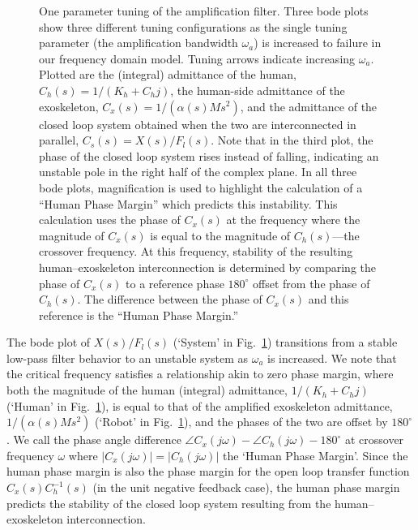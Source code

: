 \documentclass[utf8]{frontiersSCNS}
\newcommand{\add}[1]{\textcolor[HTML]{8710b3}{#1}}
\begin{document}
\begin{figure}
	\centering
	\resizebox{1\textwidth}{!}{
	\def\svgwidth{\textwidth}
	{%
		}}
	\caption{One parameter tuning of the amplification filter. Three bode plots show three different tuning configurations as the single tuning parameter (the amplification bandwidth $\omega_a$) is increased to failure in our frequency domain model. Tuning arrows indicate increasing $\omega_a$. Plotted are the (integral) admittance of the human, $C_h(s)=1/(K_h+C_h j)$, the human-side admittance of the exoskeleton, $C_x(s)=1/(\alpha(s)Ms^2)$, and the admittance of the closed loop system obtained when the two are interconnected in parallel, $C_s(s) = X(s)/F_l(s)$. Note that in the third plot, the phase of the closed loop system rises instead of falling, indicating an unstable pole in the right half of the complex plane. In all three bode plots, magnification is used to highlight the calculation of a ``Human Phase Margin'' which predicts this instability. This calculation uses the phase of $C_x(s)$ at the frequency where the magnitude of $C_x(s)$ is equal to the magnitude of $C_h(s)$---the crossover frequency. At this frequency, stability of the resulting human--exoskeleton interconnection is determined by comparing the phase of $C_x(s)$ to a reference phase $180^\circ$ offset from the phase of $C_h(s)$. The difference between the phase of $C_x(s)$ and this reference is the ``Human Phase Margin.'' }\label{fig:oneptune}
\end{figure}

The bode plot of $X(s)/F_l(s)$ (`System' in Fig.~\ref{fig:oneptune}) transitions from a stable low-pass filter behavior to an unstable system as $\omega_a$ is increased. We note that the critical frequency satisfies a relationship akin to zero phase margin, where both the magnitude of the human (integral) admittance, $1/(K_h+C_h j)$ (`Human' in Fig.~\ref{fig:oneptune}), is equal to that of the amplified exoskeleton admittance, $1/(\alpha(s)Ms^2)$ (`Robot' in Fig.~\ref{fig:oneptune}), and the phases of the two are offset by $180^\circ$. \add{We call the phase angle difference $\angle C_x(j\omega)-\angle C_h(j\omega)-180^\circ$ at crossover frequency $\omega$ where $|C_x(j\omega)|=|C_h(j\omega)|$ the `Human Phase Margin'. Since the human phase margin is also the phase margin for the open loop transfer function $C_x(s)C_h^{-1}(s)$ (in the unit negative feedback case), the human phase margin predicts the stability of the closed loop system resulting from the human--exoskeleton interconnection.}
\end{document}
